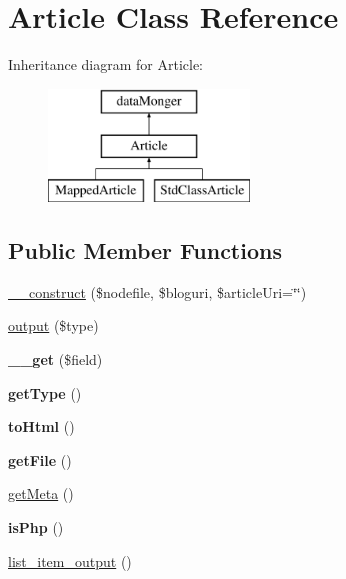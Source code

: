 \hypertarget{classArticle}{\section{Article Class Reference}
\label{classArticle}
}
Inheritance diagram for Article\-:\begin{figure}[H]
\begin{center}
\leavevmode
\includegraphics[height=3.000000cm]{classArticle}
\end{center}
\end{figure}
\subsection*{Public Member Functions}
\begin{DoxyCompactItemize}
\item 
\hyperlink{classArticle_adb596ef1ab204262955138e5ff0a1377}{\-\_\-\-\_\-construct} (\$nodefile, \$bloguri, \$article\-Uri=\char`\"{}\char`\"{})
\item 
\hyperlink{classArticle_a90b49a613da465992c1043cd6d05ba5c}{output} (\$type)
\item 
\hypertarget{classArticle_a071906d9ce04b17172b90c98580f756b}{{\bfseries \-\_\-\-\_\-get} (\$field)}\label{classArticle_a071906d9ce04b17172b90c98580f756b}

\item 
\hypertarget{classArticle_aa442e22d35ef95a59311d27d961f0500}{{\bfseries get\-Type} ()}\label{classArticle_aa442e22d35ef95a59311d27d961f0500}

\item 
\hypertarget{classArticle_a8606bdb0de316f756556dac0177dd90f}{{\bfseries to\-Html} ()}\label{classArticle_a8606bdb0de316f756556dac0177dd90f}

\item 
\hypertarget{classArticle_a5475487ea43ca5c70707b1b28e6412cb}{{\bfseries get\-File} ()}\label{classArticle_a5475487ea43ca5c70707b1b28e6412cb}

\item 
\hyperlink{classArticle_a0d24e46f7502bdba6e2ca8e01e0d9a80}{get\-Meta} ()
\item 
\hypertarget{classArticle_aa588eee2483d06777cadbd707cebdf7d}{{\bfseries is\-Php} ()}\label{classArticle_aa588eee2483d06777cadbd707cebdf7d}

\item 
\hyperlink{classArticle_a1c737010310ab287f97aa22e987c6c47}{list\-\_\-item\-\_\-output} ()
\end{DoxyCompactItemize}
